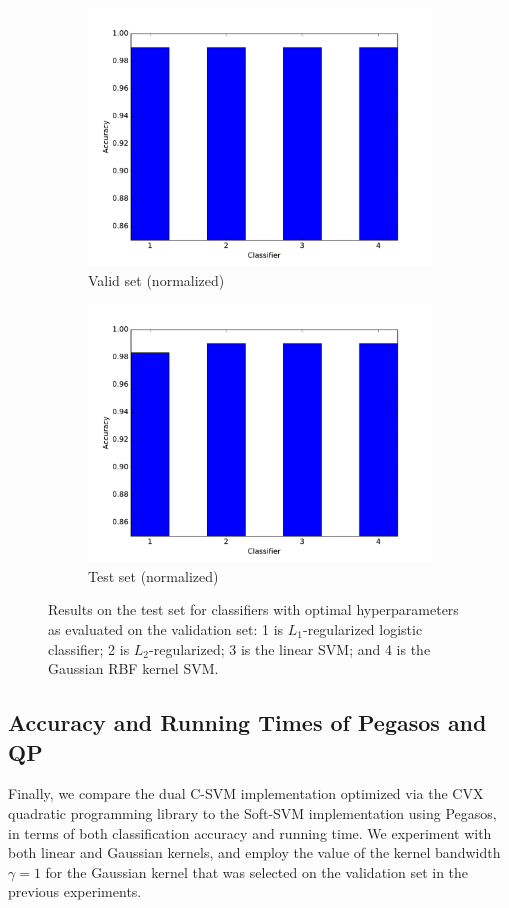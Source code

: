 \documentclass[10pt,psamsfonts]{amsart}
\theoremstyle{definition}
\theoremstyle{remark}
\numberwithin{equation}{section}
\begin{document}
\begin{figure}
\begin{subfigure}[b]{0.23\textwidth}
		\includegraphics[width=\textwidth]{hw2_4-2_valid_norm.pdf}
		\caption{Valid set (normalized)}
	\end{subfigure}
	\begin{subfigure}[b]{0.23\textwidth}
		\includegraphics[width=\textwidth]{hw2_4-2_test_norm.pdf}
		\caption{Test set (normalized)}
	\end{subfigure}
	\caption{Results on the test set for classifiers with optimal hyperparameters as evaluated on the validation set: 1 is $L_1$-regularized logistic classifier; 2 is $L_2$-regularized; 3 is the linear SVM; and 4 is the Gaussian RBF kernel SVM.}
\end{figure}

\subsection{Accuracy and Running Times of Pegasos and QP} Finally, we compare the dual C-SVM implementation optimized via the CVX quadratic programming library to the Soft-SVM implementation using Pegasos, in terms of both classification accuracy and running time. We experiment with both linear and Gaussian kernels, and employ the value of the kernel bandwidth $\gamma = 1$ for the Gaussian kernel that was selected on the validation set in the previous experiments.
\end{document}

